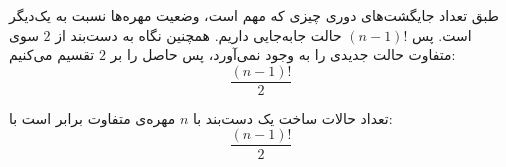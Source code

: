 \p
طبق تعداد جایگشت‌های دوری
چیزی که مهم است، وضعیت مهره‌ها نسبت به یک‌دیگر است. پس
$(n-1)!$
حالت جا‌به‌جایی داریم. همچنین نگاه به دست‌بند از
$2$
    سوی متفاوت حالت جدیدی را به وجود نمی‌آورد، پس حاصل را بر 
$2$
    تقسیم می‌کنیم:
$$\frac{(n-1)!}{2}$$

\begin{theorem}
تعداد حالات ساخت یک دست‌بند با
$n$
مهره‌ی متفاوت برابر است با:
$$\frac{(n-1)!}{2}$$
\end{theorem}